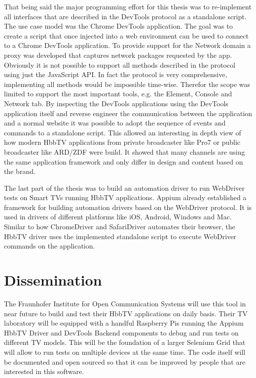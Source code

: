 That being said the major programming effort for this thesis was to re-implement all interfaces that are described in
the DevTools protocol as a standalone script. The use case model was the Chrome DevTools application. The goal was to
create a script that once injected into a web environment can be used to connect to a Chrome DevTools application. To
provide support for the Network domain a proxy was developed that captures network packages requested by the
app. Obviously it is not possible to support all methods described in the protocol using just the JavaScript
API. In fact the protocol is very comprehensive, implementing all methods would be impossible time-wise. Therefor the
scope was limited to support the most important tools, e.g. the Element, Console and Network tab. By inspecting the
DevTools applications using the DevTools application itself and reverse engineer the communication between the
application and a normal website it was possible to adopt the sequence of events and commands to a standalone script.
This allowed an interesting in depth view of how modern HbbTV applications from private broadcaster like Pro7 or
public broadcaster like ARD/ZDF were build. It showed that many channels are using the same application framework
and only differ in design and content based on the brand.

The last part of the thesis was to build an automation driver to run WebDriver tests on Smart TVs running HbbTV
applications. Appium already established a framework for building automation drivers based on the WebDriver
protocol. It is used in drivers of different platforms like iOS, Android, Windows and Mac. Similar
to how ChromeDriver and SafariDriver automates their browser, the HbbTV driver uses the implemented standalone
script to execute WebDriver commands on the application.

\section{Dissemination\label{sec:dissemination}}


The Fraunhofer Institute for Open Communication Systems will use this tool in near future to build and test their
HbbTV applications on daily basis. Their TV laboratory will be equipped with a handful Raspberry Pis running the
Appium HbbTV Driver and DevTools Backend components to debug and run tests on different TV models. This will be the
foundation of a larger Selenium Grid that will allow to run tests on multiple devices at the same time. The code
itself will be documented and open sourced so that it can be improved by people that are interested in this software.

